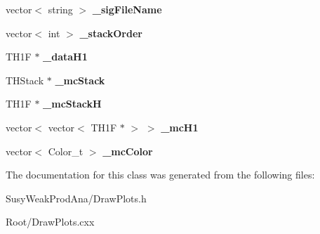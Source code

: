 \begin{DoxyCompactItemize}
\item 
\hypertarget{classDrawPlots_a1bf10598f7752723c101cdfe21465c3f}{
vector$<$ string $>$ {\bfseries \_\-sigFileName}}
\label{classDrawPlots_a1bf10598f7752723c101cdfe21465c3f}

\item 
\hypertarget{classDrawPlots_a5157097d90479d94a8fb8a5757505a64}{
vector$<$ int $>$ {\bfseries \_\-stackOrder}}
\label{classDrawPlots_a5157097d90479d94a8fb8a5757505a64}

\item 
\hypertarget{classDrawPlots_a83892451312ac60734635569a01019d0}{
TH1F $\ast$ {\bfseries \_\-dataH1}}
\label{classDrawPlots_a83892451312ac60734635569a01019d0}

\item 
\hypertarget{classDrawPlots_a66f7952d4808915e7050632fbe3a2fa8}{
THStack $\ast$ {\bfseries \_\-mcStack}}
\label{classDrawPlots_a66f7952d4808915e7050632fbe3a2fa8}

\item 
\hypertarget{classDrawPlots_a44e4f98ea36ae99f5cdc45e6173d1db6}{
TH1F $\ast$ {\bfseries \_\-mcStackH}}
\label{classDrawPlots_a44e4f98ea36ae99f5cdc45e6173d1db6}

\item 
\hypertarget{classDrawPlots_abd086847c842095871053ffc776a7fd1}{
vector$<$ vector$<$ TH1F $\ast$ $>$ $>$ {\bfseries \_\-mcH1}}
\label{classDrawPlots_abd086847c842095871053ffc776a7fd1}

\item 
\hypertarget{classDrawPlots_ae3edeca58eaed10cb3ad3c058b9150d4}{
vector$<$ Color\_\-t $>$ {\bfseries \_\-mcColor}}
\label{classDrawPlots_ae3edeca58eaed10cb3ad3c058b9150d4}

\end{DoxyCompactItemize}


The documentation for this class was generated from the following files:\begin{DoxyCompactItemize}
\item 
SusyWeakProdAna/DrawPlots.h\item 
Root/DrawPlots.cxx\end{DoxyCompactItemize}

